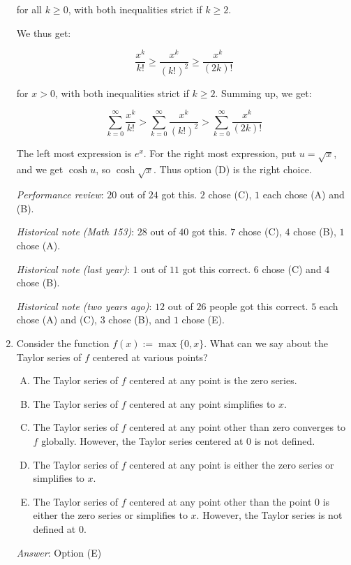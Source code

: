 \documentclass[10pt]{amsart}
\begin{document}
\begin{enumerate}
  for all $k \ge 0$, with both inequalities strict if $k \ge 2$.

  We thus get:

  $$\frac{x^k}{k!} \ge \frac{x^k}{(k!)^2} \ge \frac{x^k}{(2k)!}$$

  for $x > 0$, with both inequalities strict if $k \ge 2$. Summing up, we get:
  
  $$\sum_{k=0}^\infty \frac{x^k}{k!} > \sum_{k=0}^\infty \frac{x^k}{(k!)^2} > \sum_{k=0}^\infty \frac{x^k}{(2k)!}$$

  The left most expression is $e^x$. For the right most expression,
  put $u = \sqrt{x}$, and we get $\cosh u$, so $\cosh \sqrt{x}$. Thus
  option (D) is the right choice.

  {\em Performance review}: $20$ out of $24$ got this. $2$ chose (C),
  $1$ each chose (A) and (B).

  {\em Historical note (Math 153)}: $28$ out of $40$ got this. $7$ chose (C),
  $4$ chose (B), $1$ chose (A).

  {\em Historical note (last year)}: $1$ out of $11$ got this correct. $6$
  chose (C) and $4$ chose (B).

  {\em Historical note (two years ago)}: $12$ out of $26$ people got this
  correct. $5$ each chose (A) and (C), $3$ chose (B), and $1$ chose
  (E).

\item Consider the function $f(x) := \max \{ 0, x\}$. What can we say
  about the Taylor series of $f$ centered at various points?

  \begin{enumerate}[(A)]
  \item The Taylor series of $f$ centered at any point is the zero
    series.
  \item The Taylor series of $f$ centered at any point simplifies to
  $x$.
  \item The Taylor series of $f$ centered at any point other than zero
    converges to $f$ globally. However, the Taylor series centered at
    $0$ is not defined.
  \item The Taylor series of $f$ centered at any point is either the
    zero series or simplifies to $x$.
  \item The Taylor series of $f$ centered at any point other than the
    point $0$ is either the zero series or simplifies to $x$. However,
    the Taylor series is not defined at $0$.
  \end{enumerate}

  {\em Answer}: Option (E)


\end{enumerate}
\end{document}
